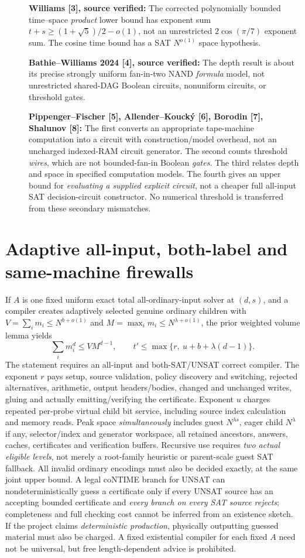\documentclass[11pt]{article}
\begin{document}
\begin{description}
\item[] \textbf{Williams [3], source verified:} The corrected polynomially bounded time--space \emph{product} lower bound has exponent sum $t+s\ge(1+\sqrt5)/2-o(1)$, not an unrestricted $2\cos(\pi/7)$ exponent sum. The cosine time bound has a SAT $N^{o(1)}$ space hypothesis.
\item[] \textbf{Bathie--Williams 2024 [4], source verified:} The depth result is about its precise strongly uniform fan-in-two NAND \emph{formula} model, not unrestricted shared-DAG Boolean circuits, nonuniform circuits, or threshold gates.
\item[] \textbf{Pippenger--Fischer [5], Allender--Kouck\'y [6], Borodin [7], Shalunov [8]:} The first converts an appropriate tape-machine computation into a circuit with construction/model overhead, not an uncharged indexed-RAM circuit generator. The second counts threshold \emph{wires}, which are not bounded-fan-in Boolean \emph{gates}. The third relates depth and space in specified computation models. The fourth gives an upper bound for \emph{evaluating a supplied explicit circuit}, not a cheaper full all-input SAT decision-circuit constructor. No numerical threshold is transferred from these secondary mismatches.
\end{description}

\section{Adaptive all-input, both-label and same-machine firewalls}
If $A$ is one fixed uniform exact total all-ordinary-input solver at $(d,s)$, and a compiler creates adaptively selected genuine ordinary children with $V=\sum_i m_i\le N^{b+o(1)}$ and $M=\max_i m_i\le N^{\lambda+o(1)}$, the prior weighted volume lemma yields
\[
 \sum_i m_i^d\le VM^{d-1},
 \qquad t'\le\max\{r,\ u+b+\lambda(d-1)\}.
\]
The statement requires an all-input and both-SAT/UNSAT correct compiler. The exponent $r$ pays setup, source validation, policy discovery and switching, rejected alternatives, arithmetic, output headers/bodies, changed and unchanged writes, gluing and actually emitting/verifying the certificate. Exponent $u$ charges repeated per-probe virtual child bit service, including source index calculation and memory reads. Peak space \emph{simultaneously} includes guest $N^{\lambda s}$, eager child $N^\lambda$ if any, selector/index and generator workspace, all retained ancestors, answers, caches, certificates and verification buffers. Recursive use requires \emph{two actual eligible levels}, not merely a root-family heuristic or parent-scale guest SAT fallback. All invalid ordinary encodings must also be decided exactly, at the same joint upper bound.
A legal coNTIME branch for UNSAT can nondeterministically guess a certificate only if every UNSAT source has an accepting bounded certificate and \emph{every branch on every SAT source rejects}; completeness and full checking cost cannot be inferred from an existence sketch. If the project claims \emph{deterministic production}, physically outputting guessed material must also be charged. A fixed existential compiler for each fixed $A$ need not be universal, but free length-dependent advice is prohibited.
\end{document}
